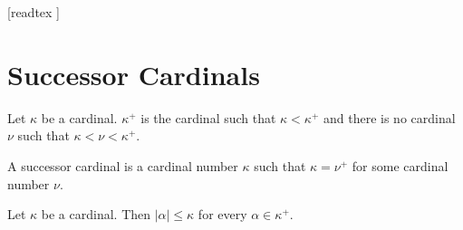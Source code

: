 \documentclass[10pt]{article}
\begin{document}
  \begin{imports}
    \begin{forthel}
      [readtex ]
    \end{forthel}
  \end{imports}


  \section*{Successor Cardinals}

  \begin{forthel}
    \begin{definition}[id=SET_THEORY_06_9568425123021254,printid]
      Let $\kappa$ be a cardinal.
      $\kappa^+$ is the cardinal such that $\kappa < \kappa^+$ and there is no cardinal $\nu$ such that $\kappa < \nu < \kappa^+$.
    \end{definition}
  \end{forthel}

  \begin{forthel}
    \begin{definition}[id=SET_THEORY_06_6818986081648640,printid]
      A successor cardinal is a cardinal number $\kappa$ such that $\kappa = \nu^+$ for some cardinal number $\nu$.
    \end{definition}
  \end{forthel}

  \begin{forthel}
    \begin{proposition}[id=SET_THEORY_06_5231202126545218,printid]
      Let $\kappa$ be a cardinal.
      Then $|\alpha| \leq \kappa$ for every $\alpha \in \kappa^+$.
    \end{proposition}
  \end{forthel}
\end{document}
